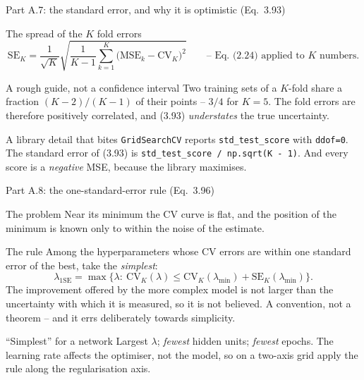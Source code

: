 \documentclass[10pt,aspectratio=169]{beamer}
\begin{document}
\begin{frame}{Part A.7: the standard error, and why it is optimistic (Eq.~3.93)}
\small
\begin{block}{The spread of the $K$ fold errors}
\[
  \mathrm{SE}_K=\frac{1}{\sqrt K}\sqrt{\frac{1}{K-1}\sum_{k=1}^{K}
  \bigl(\mathrm{MSE}_k-\mathrm{CV}_K\bigr)^{2}}
  \qquad\text{-- Eq.~(2.24) applied to $K$ numbers.}
\]
\end{block}
\begin{block}{A rough guide, not a confidence interval}
Two training sets of a $K$-fold share a fraction $(K-2)/(K-1)$ of their
points -- $3/4$ for $K=5$.  The fold errors are therefore positively
correlated, and (3.93) \emph{understates} the true uncertainty.
\end{block}
\begin{block}{A library detail that bites}
\texttt{GridSearchCV} reports \texttt{std\_test\_score} with
\texttt{ddof=0}.  The standard error of (3.93) is
\texttt{std\_test\_score / np.sqrt(K - 1)}.  And every score is a
\emph{negative} MSE, because the library maximises.
\end{block}
\end{frame}

\begin{frame}{Part A.8: the one-standard-error rule (Eq.~3.96)}
\small
\begin{block}{The problem}
Near its minimum the CV curve is flat, and the position of the minimum is
known only to within the noise of the estimate.
\end{block}
\begin{block}{The rule}
Among the hyperparameters whose CV errors are within one standard error
of the best, take the \emph{simplest}:
\[
  \lambda_{1\mathrm{SE}}=\max\bigl\{\lambda:\ \mathrm{CV}_K(\lambda)\le
  \mathrm{CV}_K(\lambda_{\min})+\mathrm{SE}_K(\lambda_{\min})\bigr\}.
\]
The improvement offered by the more complex model is not larger than the
uncertainty with which it is measured, so it is not believed.  A
convention, not a theorem -- and it errs deliberately towards simplicity.
\end{block}
\begin{block}{``Simplest'' for a network}
Largest $\lambda$; \emph{fewest} hidden units; \emph{fewest} epochs.  The
learning rate affects the optimiser, not the model, so on a two-axis grid
apply the rule along the regularisation axis.
\end{block}
\end{frame}
\end{document}
